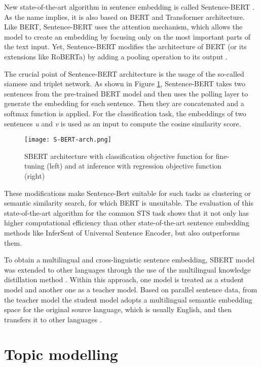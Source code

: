 \documentclass[fontsize=12pt,a4paper,twoside,openany]{scrbook}
\begin{document}
New state-of-the-art algorithm in sentence embedding is called Sentence-BERT \parencite{Reimers19}. As the name implies, it is also based on BERT and Transformer architecture. Like BERT, Sentence-BERT uses the attention mechanism, which allows the model to create an embedding by focusing only on the most important parts of the text input. Yet, Sentence-BERT modifies the architecture of BERT (or its extensions like RoBERTa) by adding a pooling operation to its output \parencite{Reimers19}.

The crucial point of Sentence-BERT architecture is the usage of the so-called siamese and triplet network. As shown in Figure \ref{fig:S-BERT-arch}, Sentence-BERT takes two sentences from the pre-trained BERT model and then uses the polling layer to generate the embedding for each sentence. Then they are concatenated and a softmax function is applied. For the classification task, the embeddings of two sentences \emph{u} and \emph{v} is used as an input to compute the cosine similarity score.


\begin{figure}[h]
\centering
\texttt{[image: S-BERT-arch.png]}
\caption{SBERT architecture with classification objective function for fine-tuning (left) and at inference with regression objective function (right) \parencite[from][]{Reimers19}}
\label{fig:S-BERT-arch}
\end{figure}

These modifications make Sentence-Bert suitable for such tasks as clustering or semantic similarity search, for which BERT is unsuitable. The evaluation of this state-of-the-art algorithm for the common STS task shows that it not only has higher computational efficiency than other state-of-the-art sentence embedding methods like InferSent of Universal Sentence Encoder, but also outperforms them.

To obtain a multilingual and cross-linguistic sentence embedding, SBERT model was extended to other languages through the use of the multilingual knowledge distillation method \parencite{Reimers20}. Within this approach, one model is treated as a student model and another one as a teacher model. Based on parallel sentence data, from the teacher model the student model adopts a multilingual semantic embedding space for the original source language, which is usually English, and then transfers it to other languages \parencite{Reimers20}. 

\section{Topic modelling}
\label{sec:B}
\end{document}

